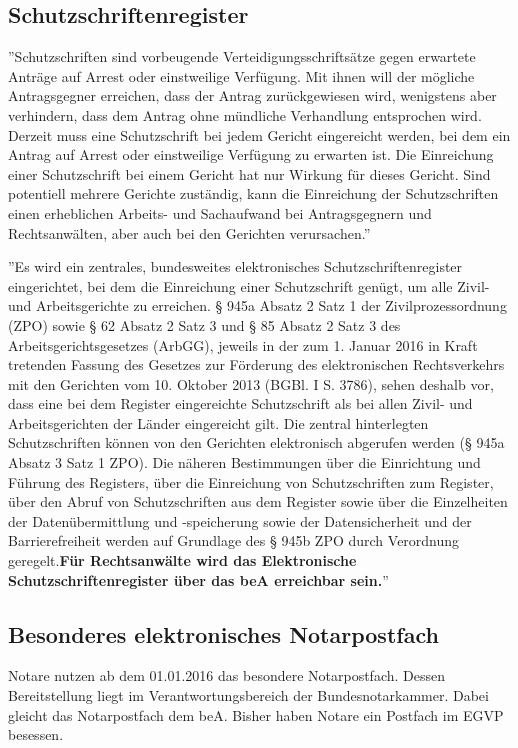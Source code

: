 \subsection{Schutzschriftenregister}
''Schutzschriften sind vorbeugende Verteidigungsschriftsätze gegen erwartete Anträge auf Arrest oder einstweilige Verfügung. Mit ihnen will der mögliche Antragsgegner erreichen, dass der Antrag zurückgewiesen wird, wenigstens aber verhindern, dass dem Antrag ohne mündliche Verhandlung entsprochen wird. Derzeit muss eine Schutzschrift bei jedem Gericht eingereicht werden, bei dem ein Antrag auf Arrest oder einstweilige Verfügung zu erwarten ist. Die Einreichung einer Schutzschrift bei einem Gericht hat nur Wirkung für dieses Gericht. Sind potentiell mehrere Gerichte zuständig, kann die Einreichung der Schutzschriften einen erheblichen Arbeits- und Sachaufwand bei Antragsgegnern und Rechtsanwälten, aber auch bei den Gerichten verursachen.'' \textcite{bea:bea:brak-schutzschriften} 

''Es wird ein zentrales, bundesweites elektronisches Schutzschriftenregister eingerichtet, bei dem die Einreichung einer Schutzschrift genügt, um alle Zivil- und Arbeitsgerichte zu erreichen. § 945a Absatz 2 Satz 1 der Zivilprozessordnung (ZPO) sowie § 62 Absatz 2 Satz 3 und § 85 Absatz 2 Satz 3 des Arbeitsgerichtsgesetzes (ArbGG), jeweils in der zum 1. Januar 2016 in Kraft tretenden Fassung des Gesetzes zur Förderung des elektronischen Rechtsverkehrs mit den Gerichten vom 10. Oktober 2013 (BGBl. I S. 3786), sehen deshalb vor, dass eine bei dem Register eingereichte Schutzschrift als bei allen Zivil- und Arbeitsgerichten der Länder eingereicht gilt. Die zentral hinterlegten Schutzschriften können von den Gerichten elektronisch abgerufen werden (§ 945a Absatz 3 Satz 1 ZPO). Die näheren Bestimmungen über die Einrichtung und Führung des Registers, über die Einreichung von Schutzschriften zum Register, über den Abruf von Schutzschriften aus dem Register sowie über die Einzelheiten der Datenübermittlung und -speicherung sowie der Datensicherheit und der Barrierefreiheit werden auf Grundlage des § 945b ZPO durch Verordnung geregelt.\textbf{Für Rechtsanwälte wird das Elektronische Schutzschriftenregister über das beA erreichbar sein.}'' \textcite{bea:bea:brak-schutzschriften}

\subsection{Besonderes elektronisches Notarpostfach}
Notare nutzen ab dem 01.01.2016 das besondere Notarpostfach. Dessen Bereitstellung liegt im Verantwortungsbereich der Bundesnotarkammer. Dabei gleicht das Notarpostfach dem beA. Bisher haben Notare ein Postfach im EGVP besessen. \textcite{bea:notarpostfach} 